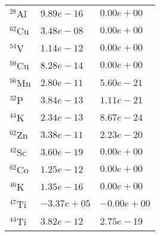 \begin{tabular}{lll}
 $^{28}$Al & $9.89e-16 $                                                        & $0.00e+00 $                                                                     \\
 $^{62}$Cu & $3.48e-08 $                                                        & $0.00e+00 $                                                                     \\
 $^{54}$V  & $1.14e-12 $                                                        & $0.00e+00 $                                                                     \\
 $^{59}$Cu & $8.28e-14 $                                                        & $0.00e+00 $                                                                     \\
 $^{56}$Mn & $2.80e-11 $                                                        & $5.60e-21 $                                                                     \\
 $^{32}$P  & $3.84e-13 $                                                        & $1.11e-21 $                                                                     \\
 $^{44}$K  & $2.34e-13 $                                                        & $8.67e-24 $                                                                     \\
 $^{62}$Zn & $3.38e-11 $                                                        & $2.23e-20 $                                                                     \\
 $^{42}$Sc & $3.60e-19 $                                                        & $0.00e+00 $                                                                     \\
 $^{62}$Co & $1.25e-12 $                                                        & $0.00e+00 $                                                                     \\
 $^{46}$K  & $1.35e-16 $                                                        & $0.00e+00 $                                                                     \\
 $^{47}$Ti & $-3.37e+05 $                                                       & $-0.00e+00 $                                                                    \\
 $^{44}$Ti & $3.82e-12 $                                                        & $2.75e-19 $                                                                     \\

\end{tabular}
